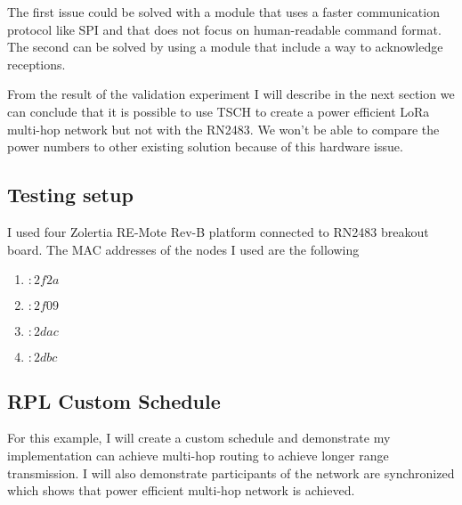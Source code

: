 
The first issue could be solved with a module that uses a faster communication
protocol like SPI and that does not focus on human-readable command format.
The second can be solved by using a module that include a way to acknowledge
receptions.

From the result of the validation experiment I will describe in the next section
we can conclude that it is possible to use TSCH to create a power efficient LoRa
multi-hop network but not with the RN2483.
We won't be able to compare the power numbers to other existing solution
because of this hardware issue.


\subsection{Testing setup}

I used four Zolertia RE-Mote Rev-B platform connected to RN2483 breakout board.
The MAC addresses of the nodes I used are the following

\begin{enumerate}
  \item $:2f2a$
  \item $:2f09$
  \item $:2dac$
  \item $:2dbc$
\end{enumerate}

\subsection{RPL Custom Schedule\label{section:tschrpl}}

For this example, I will create a custom schedule and demonstrate
my implementation can achieve multi-hop routing to achieve longer range
transmission.
I will also demonstrate participants of the network are synchronized which shows
that power efficient multi-hop network is achieved.

\paragraph{}

